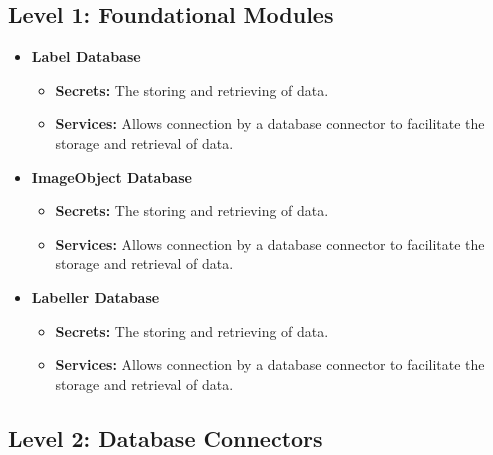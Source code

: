 \documentclass[12pt, titlepage]{article}
\begin{document}


\subsection*{Level 1: Foundational Modules}

\begin{itemize}
    \item \textbf{Label Database}
    \begin{itemize}
        \item \textbf{Secrets:} The storing and retrieving of data.
        \item \textbf{Services:} Allows connection by a database connector to facilitate the storage and retrieval of data.
    \end{itemize}
    \item \textbf{ImageObject Database}
    \begin{itemize}
        \item \textbf{Secrets:} The storing and retrieving of data.
        \item \textbf{Services:} Allows connection by a database connector to facilitate the storage and retrieval of data.
    \end{itemize}
    \item \textbf{Labeller Database}
    \begin{itemize}
        \item \textbf{Secrets:} The storing and retrieving of data.
        \item \textbf{Services:} Allows connection by a database connector to facilitate the storage and retrieval of data.
    \end{itemize}
\end{itemize}

\subsection*{Level 2: Database Connectors}
\end{document}
